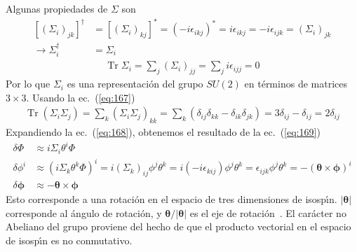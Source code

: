 Algunas propiedades de $\Sigma$ son
\begin{align}
\left[(\Sigma_i)_{jk}\right]^\dagger&=\left[(\Sigma_i)_{kj}\right]^*=(-i\epsilon_{ikj})^*=i\epsilon_{ikj}=-i\epsilon_{ijk}=(\Sigma_i)_{jk}\nonumber\\
\to\Sigma_i^\dagger&=\Sigma_i 
\end{align}
\begin{align}
  \operatorname{Tr}\Sigma_i=\sum_j(\Sigma_i)_{jj}=\sum_ji\epsilon_{ijj}=0
\end{align}
Por lo que $\Sigma_i$ es una representaci\'on del grupo $SU(2)$ en t\'erminos de matrices $3\times3$. Usando la ec.~(\ref{eq:167})
\begin{align}
  \label{eq:171}
  \operatorname{Tr}(\Sigma_i\Sigma_j)=\sum_{k}(\Sigma_i\Sigma_j)_{kk}=\sum_{k}(\delta_{ij}\delta_{kk}-\delta_{ik}\delta_{jk})=3\delta_{ij}-\delta_{ij}=2\delta_{ij}
\end{align}
Expandiendo la ec.~(\ref{eq:168}), obtenemos el resultado de la ec.~(\ref{eq:169})
\begin{align}
  \delta\Phi&\approx i\Sigma_i\theta^i\Phi\nonumber\\
\delta\phi^i&\approx(i\Sigma_k\theta^k\Phi)^i=i(\Sigma_k)_{ij}\phi^j\theta^k=i(-i\epsilon_{kij})\phi^j\theta^k=\epsilon_{ijk}\phi^j\theta^k=-(\boldsymbol{\theta}\times\boldsymbol{\phi})^i\nonumber\\
\delta\boldsymbol{\phi}&\approx-\boldsymbol{\theta}\times\boldsymbol{\phi}
\end{align}
Esto corresponde a una rotaci\'on en el espacio de tres dimensiones de isosp\'\i n. $|\boldsymbol{\theta}|$ corresponde al \'angulo de rotaci\'on, y $\boldsymbol{\theta}/|\boldsymbol{\theta}|$ es el eje de rotaci\'on~\cite{Ryder:1985wq}. El car\'acter no Abeliano del grupo proviene del hecho de que el producto vectorial en el espacio de isosp\'\i n es no conmutativo.

